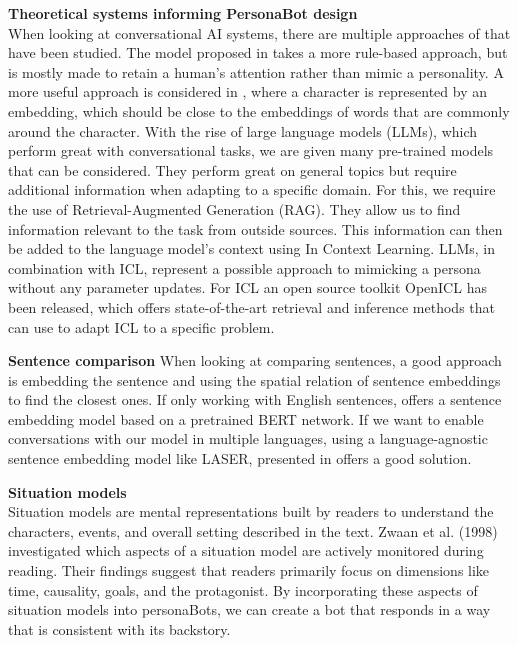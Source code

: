 \documentclass[fleqn,moreauthors,10pt]{ds_report}
\begin{document}
\textbf{Theoretical systems informing PersonaBot design} \\
When looking at conversational AI systems, there are multiple approaches of that have been studied. The model proposed in \cite{papaioannou2022designing} takes a more rule-based approach, but is mostly made to retain a human's attention rather than mimic a personality. A more useful approach is considered in \cite{li2016persona}, where a character is represented by an embedding, which should be close to the embeddings of words that are commonly around the character. With the rise of large language models (LLMs), \cite{minaee2024large} which perform great with conversational tasks, we are given many pre-trained models that can be considered. They perform great on general topics but require additional information when adapting to a specific domain. For this, we require the use of Retrieval-Augmented Generation (RAG). They allow us to find information relevant to the task from outside sources. This information can then be added to the language model's context using In Context Learning. LLMs, in combination with ICL, represent a possible approach to mimicking a persona without any parameter updates. For ICL an open source toolkit OpenICL \cite{wu2023openicl} has been released, which offers state-of-the-art retrieval and inference methods that can use to adapt ICL to a specific problem. 


\textbf{Sentence comparison} 
When looking at comparing sentences, a good approach is embedding the sentence and using the spatial relation of sentence embeddings to find the closest ones. If only working with English sentences, \cite{reimers-gurevych-2019-sentence} offers a sentence embedding model based on a pretrained BERT network. If we want to enable conversations with our model in multiple languages, using a language-agnostic sentence embedding model like LASER, presented in \cite{schwenk2017learning} offers a good solution.

\textbf{Situation models} \\
Situation models are mental representations built by readers to understand the characters, events, and overall setting described in the text. Zwaan et al. (1998) \cite{zwaan1998constructing} investigated which aspects of a situation model are actively monitored during reading. Their findings suggest that readers primarily focus on dimensions like time, causality, goals, and the protagonist. By incorporating these aspects of situation models into personaBots, we can create a bot that responds in a way that is consistent with its backstory.
\end{document}

